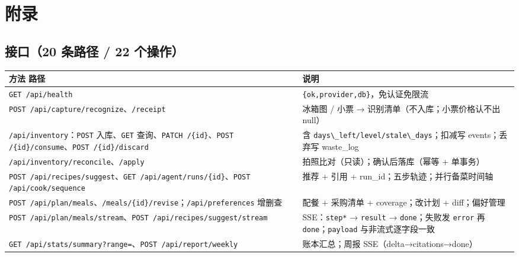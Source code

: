 \section{附录}\label{ux9644ux5f55}

\subsection{接口（20 条路径 / 22
个操作）}\label{ux63a5ux53e320-ux6761ux8defux5f84-22-ux4e2aux64cdux4f5c}

{\def\LTcaptype{none} %
\begin{longtable}[]{@{}
  >{\raggedright\arraybackslash}p{}
  >{\raggedright\arraybackslash}p{}@{}}
\toprule\noalign{}
\begin{minipage}[b]{\linewidth}\raggedright
方法 路径
\end{minipage} & \begin{minipage}[b]{\linewidth}\raggedright
说明
\end{minipage} \\
\midrule\noalign{}
\endhead
\bottomrule\noalign{}
\endlastfoot
\passthrough{\lstinline!GET /api/health!} &
\passthrough{\lstinline!\{ok,provider,db\}!}，免认证免限流 \\
\passthrough{\lstinline!POST /api/capture/recognize!}、\passthrough{\lstinline!/receipt!}
& 冰箱图 / 小票 → 识别清单（不入库；小票价格认不出 null） \\
\passthrough{\lstinline!/api/inventory!}：\passthrough{\lstinline!POST!}
入库、\passthrough{\lstinline!GET!}
查询、\passthrough{\lstinline!PATCH /\{id\}!}、\passthrough{\lstinline!POST /\{id\}/consume!}、\passthrough{\lstinline!POST /\{id\}/discard!}
& 含 \passthrough{\lstinline!days\_left/level/stale\_days!}；扣减写
events；丢弃写 waste\_log \\
\passthrough{\lstinline!/api/inventory/reconcile!}、\passthrough{\lstinline!/apply!}
& 拍照比对（只读）；确认后落库（幂等 + 单事务） \\
\passthrough{\lstinline!POST /api/recipes/suggest!}、\passthrough{\lstinline!GET /api/agent/runs/\{id\}!}、\passthrough{\lstinline!POST /api/cook/sequence!}
& 推荐 + 引用 + run\_id；五步轨迹；并行备菜时间轴 \\
\passthrough{\lstinline!POST /api/plan/meals!}、\passthrough{\lstinline!/meals/\{id\}/revise!}；\passthrough{\lstinline!/api/preferences!}
增删查 & 配餐 + 采购清单 + coverage；改计划 + diff；偏好管理 \\
\passthrough{\lstinline!POST /api/plan/meals/stream!}、\passthrough{\lstinline!POST /api/recipes/suggest/stream!}
& SSE：\passthrough{\lstinline!step*!} →
\passthrough{\lstinline!result!} →
\passthrough{\lstinline!done!}；失败发 \passthrough{\lstinline!error!}
再 \passthrough{\lstinline!done!}；\passthrough{\lstinline!payload!}
与非流式逐字段一致 \\
\passthrough{\lstinline!GET /api/stats/summary?range=!}、\passthrough{\lstinline!POST /api/report/weekly!}
& 账本汇总；周报 SSE（delta→citations→done） \\
\end{longtable}
}

